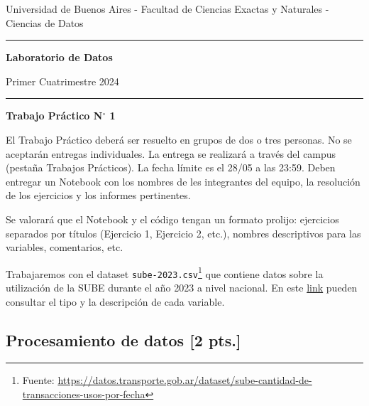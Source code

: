 \documentclass[a4paper,11pt]{article}
\theoremstyle{definition}
\begin{document}
\centerline{{\small Universidad de Buenos Aires - Facultad de Ciencias Exactas y Naturales - Ciencias de Datos}}

\vskip 0.2cm

\hrule

\vskip 0.2cm

 \centerline{{\bf\Large{\sc Laboratorio de Datos}}}

 \vskip 0.2cm

 \centerline{\ttfamily Primer Cuatrimestre 2024}

\vskip 0.2cm

 \hrule

 \bigskip
 \centerline{\bf Trabajo Práctico N$^\circ$ 1}
 \bigskip

El Trabajo Práctico deberá ser resuelto en grupos de dos o tres personas. No se aceptarán entregas individuales. La entrega se realizará a través del campus (pestaña Trabajos Prácticos). La fecha límite es el 28/05 a las 23:59. Deben entregar un Notebook con los nombres de les integrantes del equipo, la resolución de los ejercicios y los informes pertinentes.

Se valorará que el Notebook y el código tengan un formato prolijo: ejercicios separados por títulos (Ejercicio 1, Ejercicio 2, etc.), nombres descriptivos para las variables, comentarios, etc.

\vspace{0.5cm}

Trabajaremos con el dataset \verb|sube-2023.csv|\footnote{Fuente: \url{https://datos.transporte.gob.ar/dataset/sube-cantidad-de-transacciones-usos-por-fecha}} que contiene datos sobre la utilización de la SUBE durante el año 2023 a nivel nacional. En este \href{https://datos.transporte.gob.ar/dataset/sube-cantidad-de-transacciones-usos-por-fecha/archivo/b5ad6c87-28ae-4893-92bd-79b115d8b6e3}{link} pueden consultar el tipo y la descripción de cada variable.

\subsection*{Procesamiento de datos [2 pts.]}
\end{document}

